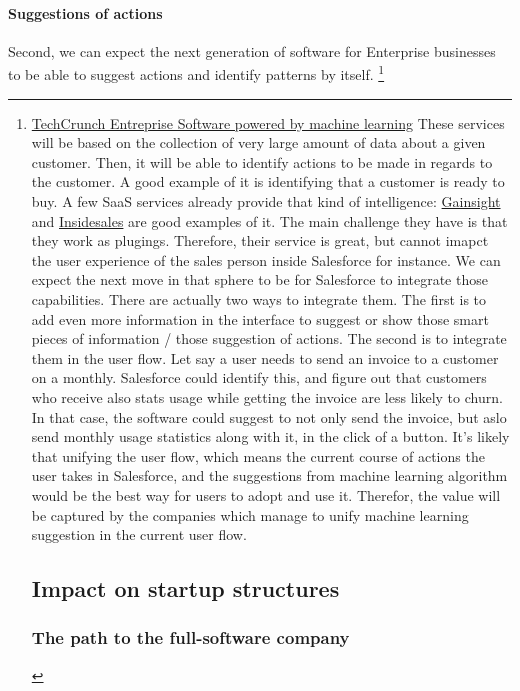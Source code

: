 \documentclass[12pt]{article}
\begin{document}
\paragraph{Suggestions of actions}

Second, we can expect the next generation of software for Enterprise businesses
to be able to suggest actions and identify patterns by itself.
\footnote{\href{http://techcrunch.com/2015/07/27/the-next-wave-of-enterprise-software-powered-by-machine-learning}
{TechCrunch Entreprise Software powered by machine learning}
These services will be based on the collection of very large amount of data about
a given customer. Then, it will be able to identify actions to be made in regards
to the customer. A good example of it is identifying that a customer is ready to
buy. A few SaaS services already provide that kind of intelligence:
\href{http://www.gainsight.com/}{Gainsight} and
\href{http://uk.insidesales.com/}{Insidesales} are good examples of it.
The main challenge they have is that they work as plugings. Therefore, their
service is great, but cannot imapct the user experience of the sales person
inside Salesforce for instance.
We can expect the next move in that sphere to be for Salesforce to integrate
those capabilities. There are actually two ways to integrate them. The first
is to add even more information in the interface to suggest or show those smart
pieces of information / those suggestion of actions. The second is to integrate
them in the user flow. Let say a user needs to send an invoice to a customer on
a monthly. Salesforce could identify this, and figure out that customers who
receive also stats usage while getting the invoice are less likely to churn. In
that case, the software could suggest to not only send the invoice, but aslo
send monthly usage statistics along with it, in the click of a button.
It's likely that unifying the user flow, which means the current course of
actions the user takes in Salesforce, and the suggestions from machine learning
algorithm would be the best way for users to adopt and use it. Therefor, the
value will be captured by the companies which manage to unify machine learning
suggestion in the current user flow.

\subsection{Impact on startup structures}

\subsubsection{The path to the full-software company}

}
\end{document}
